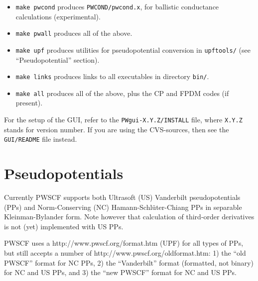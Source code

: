\documentclass[12pt]{article}
\begin{document}
\begin{itemize}
\begin{itemize}
{\tt awk -f bs.awk < my-pw-file > myfile.bs } (basic file)\\
{\tt awk -f mv.awk < my-pw-file > myfile.mv } (movie file)\\
The files so produced are suitable for use with {\tt xbs}, a very 
simple X-windows utility to display molecules, available at:\\ 
{\tt http://www.ccl.net/cca/software/X-WINDOW/xbsa/README.shtml}.
\end{itemize}
{\tt make nc} produces {\tt PWNC/pw.x}, the version of {\tt pw.x} 
that works with noncolinear magnetism (experimental).
\item
{\tt make pwcond} produces {\tt PWCOND/pwcond.x}, for ballistic
conductance calculations (experimental).
\item {\tt make pwall} produces all of the above.
\item {\tt make upf} produces utilities for pseudopotential conversion 
in {\tt upftools/} (see ``Pseudopotential'' section).
\item {\tt make links} produces links to all executables in directory {\tt bin/}.
\item {\tt make all} produces all of the above, plus the CP and FPDM
codes (if present).
\end{itemize}
For the setup of the GUI, refer to the {\tt PWgui-X.Y.Z/INSTALL}
file, where {\tt X.Y.Z} stands for version number. If you are using
the CVS-sources, then see the {\tt GUI/README} file instead.

\newpage

\section{Pseudopotentials}

Currently PWSCF supports both Ultrasoft (US) Vanderbilt pseudopotentials
(PPs) and Norm-Conserving (NC) Hamann-Schl\"uter-Chiang PPs in separable
Kleinman-Bylander form. Note however that calculation of third-order
derivatives is not (yet) implemented with US PPs.

PWSCF uses a 
{http://www.pwscf.org/format.htm} (UPF)
for all types of PPs, but still accepts a number
of 
{http://www.pwscf.org/oldformat.htm}:
1) the ``old PWSCF'' format for NC PPs, 2) the ``Vanderbilt'' format 
(formatted, not binary) for NC and US PPs, and 3) the ``new PWSCF'' 
format for NC and US PPs.
\end{document}
